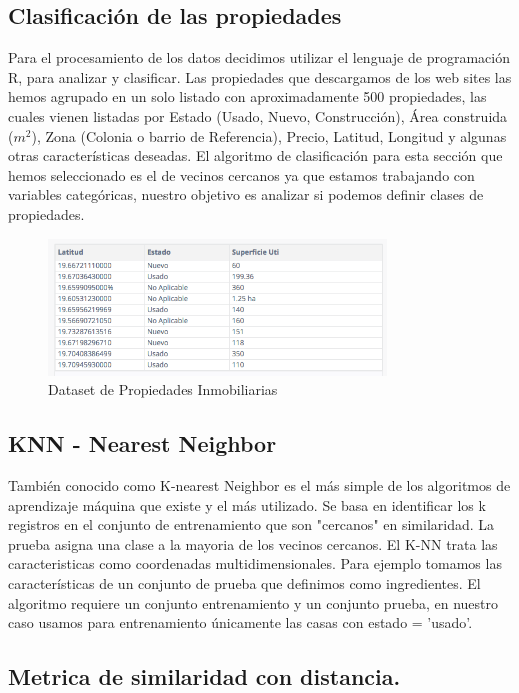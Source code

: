 \subsection{Clasificación de las propiedades}
Para el procesamiento de los datos decidimos utilizar el lenguaje de programación R, para analizar y clasificar. Las propiedades que descargamos de los web sites las hemos agrupado en un solo listado con aproximadamente 500 propiedades, las cuales  vienen listadas por Estado (Usado, Nuevo, Construcción), Área construida ($m^2$), Zona (Colonia o barrio de Referencia), Precio, Latitud, Longitud y algunas otras características deseadas.  El algoritmo de clasificación para esta sección que hemos seleccionado es el de vecinos cercanos ya que estamos trabajando con variables categóricas, nuestro objetivo es analizar si podemos definir clases de propiedades.
\begin{figure}[htbp]
\centering
\includegraphics[width=0.8\textwidth]{Dataset.png}
\caption{Dataset de Propiedades Inmobiliarias}
\end{figure}


\subsection{KNN - Nearest Neighbor}
También conocido como K-nearest Neighbor es el más simple de los algoritmos de aprendizaje máquina que existe y el más utilizado. Se basa en identificar los k  registros en el conjunto de entrenamiento que son "cercanos" en similaridad. La prueba asigna una clase a la mayoria de los vecinos cercanos. El K-NN trata las caracteristicas como coordenadas multidimensionales. Para ejemplo tomamos las características de un conjunto de prueba que definimos como ingredientes. El algoritmo requiere un conjunto entrenamiento y un conjunto prueba, en nuestro caso usamos para entrenamiento únicamente las casas con estado = 'usado'.

\subsection{Metrica de similaridad con distancia.}

